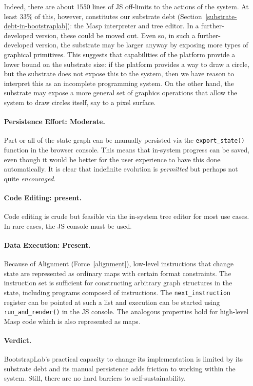 \documentclass[ twoside,openright,titlepage,numbers=noenddot,headinclude,footinclude,cleardoublepage=empty,abstract=on,
                BCOR=5mm,paper=a4,fontsize=11pt
                ]{scrreprt}
\newcommand{\criterion}{\paragraph}
\theoremstyle{definition}
\begin{document}
Indeed, there are about 1550 lines of \ac{JS} off-limits to the actions
of the system. At least 33\% of this, however, constitutes our substrate
debt (Section~\ref{substrate-debt-in-bootstraplab}): the Masp
interpreter and tree editor. In a further-developed version, these could
be moved out. Even so, in such a further-developed version, the
substrate may be larger anyway by exposing more types of graphical
primitives. This suggests that capabilities of the platform provide a
lower bound on the substrate size: if the platform provides a way to
draw a circle, but the substrate does not expose this to the system,
then we have reason to interpret this as an incomplete programming
system. On the other hand, the substrate may expose a more general set
of graphics operations that allow the system to draw circles itself, say
to a pixel surface.

\criterion{Persistence Effort: Moderate.} Part or all of the state graph
can be manually persisted via the \texttt{export\_state()} function in
the browser console. This means that in-system progress can be saved,
even though it would be better for the user experience to have this done
automatically. It is clear that indefinite evolution is \emph{permitted}
but perhaps not quite \emph{encouraged}.

\criterion{Code Editing: present.} Code editing is crude but feasible
via the in-system tree editor for most use cases. In rare cases, the
\ac{JS} console must be used.

\criterion{Data Execution: Present.} Because of Alignment
(Force~\ref{alignment}), low-level instructions that change state are
represented as ordinary maps with certain format constraints. The
instruction set is sufficient for constructing arbitrary graph
structures in the state, including programs composed of instructions.
The \texttt{next\_instruction} register can be pointed at such a list
and execution can be started using \texttt{run\_and\_render()} in the
\ac{JS} console. The analogous properties hold for high-level Masp code
which is also represented as maps.

\paragraph{Verdict.}

BootstrapLab's practical capacity to change its implementation is
limited by its substrate debt and its manual persistence adds friction
to working within the system. Still, there are no hard barriers to
self-sustainability.
\end{document}
